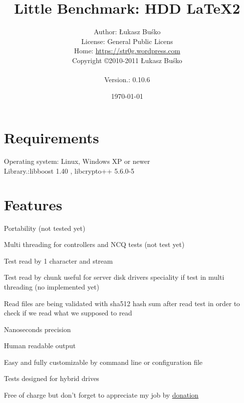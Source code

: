 \documentclass[a4paper]{article}
\begin{document}
\title{Little Benchmark: HDD  \LaTeX2}
\author{Author: Łukasz Buśko
\\License: General Public Licens
\\Home:  \href{https://str0g.wordpress.com}{https://str0g.wordpress.com}
\\Copyright \copyright 2010-2011 Łukasz Buśko\\
\date{\today} Version.: 0.10.6}
\maketitle
\newpage
\tableofcontents
\newpage

\section{Requirements}
Operating system: Linux, Windows XP or newer\\
Library.:libboost 1.40 , libcrypto++ 5.6.0-5
\section{Features}
\begin{itemized}
\item Portability (not tested yet)
\item Multi threading for controllers and NCQ tests (not test yet)
\item Test read by 1 character and stream
\item Test read by chunk useful for server disk drivers speciality if test in multi threading (no implemented yet)
\item Read files are being validated with sha512 hash sum after read test in order to check if we read what we supposed to read
\item Nanoseconds precision
\item Human readable output
\item Easy and fully customizable by command line or configuration file
\item Tests designed for hybrid drives
\item Free of charge but don't forget to appreciate my job by \href{http://str0g.wordpress.com/about/}{\underline{donation}}
\end{itemized}

\newpage

\newpage


\newpage


\newpages
\end{document}
